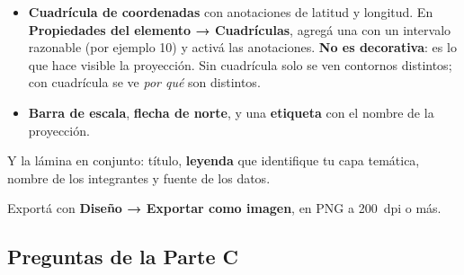 \documentclass{article}
\begin{document}
\begin{itemize}
    \item \textbf{Cuadrícula de coordenadas} con anotaciones de latitud y longitud. En \textbf{Propiedades del elemento → Cuadrículas}, agregá una con un intervalo razonable (por ejemplo 10\textdegree) y activá las anotaciones. \textbf{No es decorativa}: es lo que hace visible la proyección. Sin cuadrícula solo se ven contornos distintos; con cuadrícula se ve \emph{por qué} son distintos.
    \item \textbf{Barra de escala}, \textbf{flecha de norte}, y una \textbf{etiqueta} con el nombre de la proyección.
\end{itemize}

Y la lámina en conjunto: título, \textbf{leyenda} que identifique tu capa temática, nombre de los integrantes y fuente de los datos.

Exportá con \textbf{Diseño → Exportar como imagen}, en PNG a 200~dpi o más.

\subsection{Preguntas de la Parte C}
\end{document}
